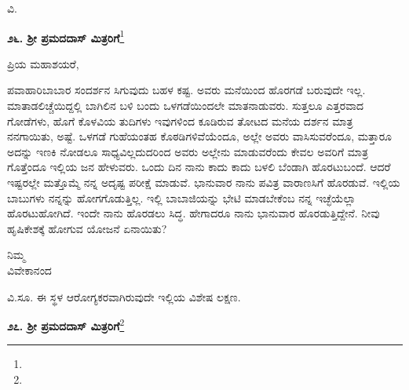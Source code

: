 \vspace{-0.45cm}

{\flushright
ವಿ.\par}

\vfill\eject

\begin{center}
\textbf{೨೬. ಶ‍್ರೀ ಪ್ರಮದದಾಸ್ ಮಿತ್ರರಿಗೆ}\footnote{}
\end{center}

\vspace{-0.5cm}

\begin{flushright}
{\fontsize{11pt}{10pt}\selectfont{ಘಾಜೀಪುರ\\[-2pt] ೩೧ನೇ ಜನವರಿ ೧೮೯೦}}
\end{flushright}
\vspace{-0.3cm}

\noindent
ಪ್ರಿಯ ಮಹಾಶಯರೆ,

ಪವಾಹಾರಿಬಾಬಾರ ಸಂದರ್ಶನ ಸಿಗುವುದು ಬಹಳ ಕಷ್ಟ. ಅವರು ಮನೆಯಿಂದ ಹೊರಗಡೆ ಬರುವುದೇ ಇಲ್ಲ. ಮಾತಾಡಲಿಚ್ಚೆಯಿದ್ದಲ್ಲಿ ಬಾಗಿಲಿನ ಬಳಿ ಬಂದು ಒಳಗಡೆಯಿಂದಲೇ ಮಾತನಾಡುವರು. ಸುತ್ತಲೂ ಎತ್ತರವಾದ ಗೋಡೆಗಳು, ಹೊಗೆ ಕೊಳವಿಯ ತುದಿಗಳು ಇವುಗಳಿಂದ ಕೂಡಿರುವ ತೋಟದ ಮನೆಯ ದರ್ಶನ ಮಾತ್ರ ನನಗಾಯಿತು, ಅಷ್ಟೆ. ಒಳಗಡೆ ಗುಹೆಯಂತಹ ಕೊಠಡಿಗಳಿವೆಯೆಂದೂ, ಅಲ್ಲೇ ಅವರು ವಾಸಿಸುವರೆಂದೂ, ಮತ್ತಾರೂ ಅದನ್ನು ಇಣಕಿ ನೋಡಲೂ ಸಾಧ್ಯವಿಲ್ಲದುದರಿಂದ ಅವರು ಅಲ್ಲೇನು ಮಾಡುವರೆಂದು ಕೇವಲ ಅವರಿಗೆ ಮಾತ್ರ ಗೊತ್ತೆಂದೂ ಇಲ್ಲಿಯ ಜನ ಹೇಳುವರು. ಒಂದು ದಿನ ನಾನು ಕಾದು ಕಾದು ಬಳಲಿ ಬೆಂಡಾಗಿ ಹೊರಟುಬಂದೆ. ಆದರೆ ಇಷ್ಟರಲ್ಲೇ ಮತ್ತೊಮ್ಮೆ ನನ್ನ ಅದೃಷ್ಟ ಪರೀಕ್ಷೆ ಮಾಡುವೆ. ಭಾನುವಾರ ನಾನು ಪವಿತ್ರ ವಾರಾಣಸಿಗೆ ಹೊರಡುವೆ. ಇಲ್ಲಿಯ ಬಾಬುಗಳು ನನ್ನನ್ನು ಹೋಗಗೊಡುತ್ತಿಲ್ಲ. ಇಲ್ಲಿ ಬಾಬಾಜಿಯನ್ನು ಭೇಟಿ ಮಾಡಬೇಕೆಂಬ ನನ್ನ ಇಚ್ಛೆಯೆಲ್ಲಾ ಹೊರಟುಹೋಗಿದೆ. ಇಂದೇ ನಾನು ಹೊರಡಲು ಸಿದ್ಧ. ಹೇಗಾದರೂ ನಾನು ಭಾನುವಾರ ಹೊರಡುತ್ತಿದ್ದೇನೆ. ನೀವು ಹೃಷಿಕೇಶಕ್ಕೆ ಹೋಗುವ ಯೋಜನೆ ಏನಾಯಿತು?

\vspace{-0.5cm}

{\flushright
ನಿಮ್ಮ\\ವಿವೇಕಾನಂದ\par}

ವಿ.ಸೂ. \enginline{-}ಈ ಸ್ಥಳ ಆರೋಗ್ಯಕರವಾಗಿರುವುದೇ ಇಲ್ಲಿಯ ವಿಶೇಷ ಲಕ್ಷಣ.

\vspace{-0.2cm}

\begin{center}
\textbf{೨೭. ಶ‍್ರೀ ಪ್ರಮದದಾಸ್ ಮಿತ್ರರಿಗೆ}\footnote{}
\end{center}

\vspace{-0.55cm}

\begin{flushright}
{\fontsize{11pt}{10pt}\selectfont{ಘಾಜೀಪುರ\\[-2pt] ೪ನೇ ಫೆಬ್ರವರಿ ೧೮೯೦}}
\end{flushright}
\vspace{-0.5cm}

